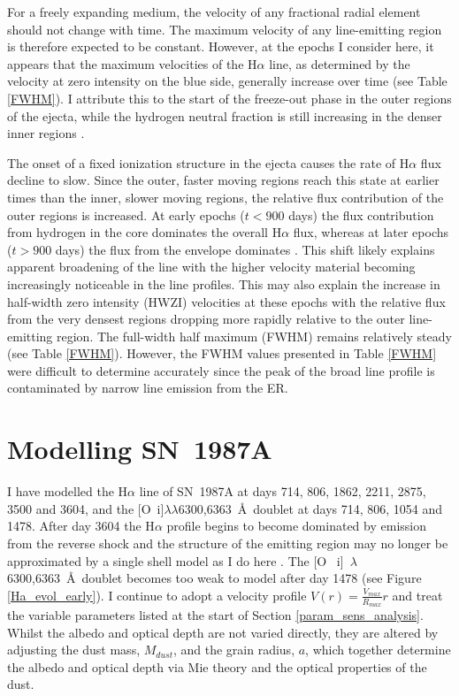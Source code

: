For a freely expanding medium, the velocity of any fractional radial 
element should not change with time.  The maximum velocity of any 
line-emitting region is therefore expected to be constant.  However, at 
the epochs I consider here, it appears that the maximum velocities of the 
H$\alpha$ line, as determined by the velocity at zero intensity on the 
blue side, generally increase over time (see Table \ref{FWHM}).  I 
attribute this to the start of the freeze-out phase in the outer regions 
of the ejecta, while the hydrogen neutral fraction is still increasing in 
the denser inner regions \citep{Danziger1991,Fransson1993}.

The onset of a fixed ionization structure in the ejecta causes the rate of 
H$\alpha$ flux decline to slow.  Since the outer, faster moving regions 
reach this state at earlier times than the inner, slower moving regions, 
the relative flux contribution of the outer regions is increased.  At 
early epochs ($t<900$ days) the flux contribution from hydrogen in the 
core dominates the overall H$\alpha$ flux, whereas at later epochs ($t > 
900$ days) the flux from the envelope dominates \citep{Fransson1993, 
Kozma1998a}.  This shift likely explains apparent broadening of the line 
with the higher velocity material becoming increasingly noticeable in the 
line profiles.  This may also explain the increase in half-width zero intensity (HWZI) velocities at 
these epochs with the relative flux from the very densest regions dropping 
more rapidly relative to the outer line-emitting region. The full-width 
half maximum (FWHM) remains relatively steady (see Table 
\ref{FWHM}). However, the FWHM values presented in Table \ref{FWHM} were difficult 
to determine accurately since the peak of the broad line profile is 
contaminated by narrow line emission from the ER.


\section{Modelling SN~1987A}
\label{results}





I have modelled the H$\alpha$ line of SN~1987A at days 714, 806, 1862, 
2211, 2875, 3500 and 3604, and the [O~{\sc i}]$\lambda\lambda$6300,6363~\AA\ 
doublet at days 714, 806, 1054 and 1478.  After day 3604 the H$\alpha$ 
profile begins to become dominated by emission from the reverse shock and 
the structure of the emitting region may no longer be approximated by a 
single shell model as I do here \citep{Fransson2013}.  The [O~{\sc 
i}]~$\lambda$6300,6363~\AA\ doublet becomes too weak to model after day 
1478 (see Figure \ref{Ha_evol_early}).  I continue to adopt a velocity 
profile $V(r) = \frac{V_{max}}{R_{max}}r$ and treat the variable 
parameters listed at the start of Section \ref{param_sens_analysis}.  Whilst the albedo and 
optical depth are not varied directly, they are altered by adjusting the 
dust mass, $M_{dust}$, and the grain radius, $a$, which together determine 
the albedo and optical depth via Mie theory and the optical properties of 
the dust.

